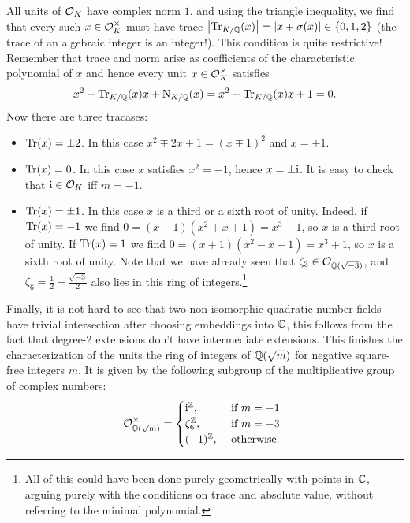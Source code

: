 \documentclass[a4paper,11pt]{article}
\begin{document}
\begin{enumerate}
        All units of $\mathcal{O}_K$ have complex norm $1$, and using the triangle
        inequality, we find that every
        such $x \in \mathcal{O}_K^\times$ must have trace $\left\lvert \operatorname{Tr}_{K/\mathbb{Q}}(x) \right\rvert = \left\lvert x +
        \sigma(x) \right\rvert \in \{0, 1, 2\}$ (the trace of an algebraic integer is an
        integer!). This condition is quite restrictive! 
        Remember that trace and norm arise as coefficients of the
        characteristic polynomial of $x$ and hence every unit
        $x \in \mathcal{O}_K^\times$ satisfies
        \begin{equation*}
            x^2 - \operatorname{Tr}_{K/\mathbb{Q}}(x) x + \operatorname{N}_{K/\mathbb{Q}}(x) = x^2 - \operatorname{Tr}_{K/\mathbb{Q}}(x) x + 1 = 0.
        \end{equation*}
        Now there are three tracases:
        \begin{itemize}
            \item $\operatorname{Tr}(x) = \pm 2$. In this case $x^2 \mp 2x + 1 = (x \mp 1)^2$
                and $x = \pm 1$. 
            \item $\operatorname{Tr}(x) = 0$. In this case $x$ satisfies $x^2 = -1$, hence
                $x = \pm \mathrm i$. It is easy to check that $\mathrm i \in \mathcal{O}_K$ iff 
                $m = -1$. 
            \item $\operatorname{Tr}(x) = \pm 1$. In this case $x$ is a third or a sixth root of
                unity. Indeed, if $\operatorname{Tr}(x) = -1$ we find $0 = (x-1)(x^2 + x + 1)
                = x^3 - 1$, so $x$ is a third root of unity. If $\operatorname{Tr}(x) = 1$ we
                find $0 = (x+1)(x^2 - x + 1) = x^3 + 1$, so $x$ is a sixth root
                of unity. Note that we have already seen that $\zeta_3 \in
                \mathcal{O}_{\mathbb{Q}(\sqrt{-3})}$, and $\zeta_6 = \frac 12 +
                \frac{\sqrt{-3}}2$ also lies in this ring of
                integers.\footnote{All of this could have been done purely
                geometrically with points in $\mathbb{C}$, arguing purely with the
                conditions on trace and absolute value, without referring to
                the minimal polynomial.}
        \end{itemize}
        Finally, it is not hard to see that two non-isomorphic quadratic number
        fields have trivial intersection after choosing embeddings into $\mathbb{C}$, this follows
        from the fact that degree-2 extensions don't have intermediate extensions.
        This finishes the characterization of the units
        the ring of integers of $\mathbb{Q}(\sqrt m)$ for negative square-free integers $m$. 
        It is given by the following subgroup of the multiplicative group of
        complex numbers:
        \begin{equation*}
            \mathcal{O}_{\mathbb{Q}(\sqrt m)}^\times = \begin{cases}
                \mathrm i^{\mathbb{Z}}, &\text{ if }m = -1\\
                \zeta_6^{\mathbb{Z}}, &\text{ if }m = -3\\
                (-1)^{\mathbb{Z}}, &\text{ otherwise. }
            \end{cases}
        \end{equation*}



\end{enumerate}
\end{document}
